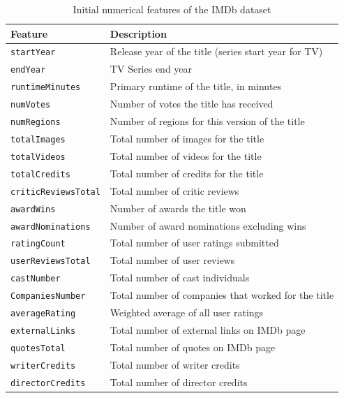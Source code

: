 \begin{table}[H]
    \centering
    \begin{tabular}{|p{4cm}|p{9cm}|}
        \hline
        \textbf{Feature} & \textbf{Description} \\ \hline
        \texttt{startYear} & Release year of the title (series start year for TV) \\ \hline
        \texttt{endYear} & TV Series end year \\ \hline
        \texttt{runtimeMinutes} & Primary runtime of the title, in minutes \\ \hline
        \texttt{numVotes} & Number of votes the title has received \\ \hline
        \texttt{numRegions} & Number of regions for this version of the title \\ \hline
        \texttt{totalImages} & Total number of images for the title \\ \hline
        \texttt{totalVideos} & Total number of videos for the title \\ \hline
        \texttt{totalCredits} & Total number of credits for the title \\ \hline
        \texttt{criticReviewsTotal} & Total number of critic reviews \\ \hline
        \texttt{awardWins} & Number of awards the title won \\ \hline
        \texttt{awardNominations} & Number of award nominations excluding wins \\ \hline
        \texttt{ratingCount} & Total number of user ratings submitted \\ \hline
        \texttt{userReviewsTotal} & Total number of user reviews \\ \hline
        \texttt{castNumber} & Total number of cast individuals \\ \hline
        \texttt{CompaniesNumber} & Total number of companies that worked for the title \\ \hline
        \texttt{averageRating} & Weighted average of all user ratings \\ \hline
        \texttt{externalLinks} & Total number of external links on IMDb page \\ \hline
        \texttt{quotesTotal} & Total number of quotes on IMDb page \\ \hline
        \texttt{writerCredits} & Total number of writer credits \\ \hline
        \texttt{directorCredits} & Total number of director credits \\ \hline
    \end{tabular}
    \caption{Initial numerical features of the IMDb dataset}
    \label{tab:initial_features_numerical}
\end{table}

